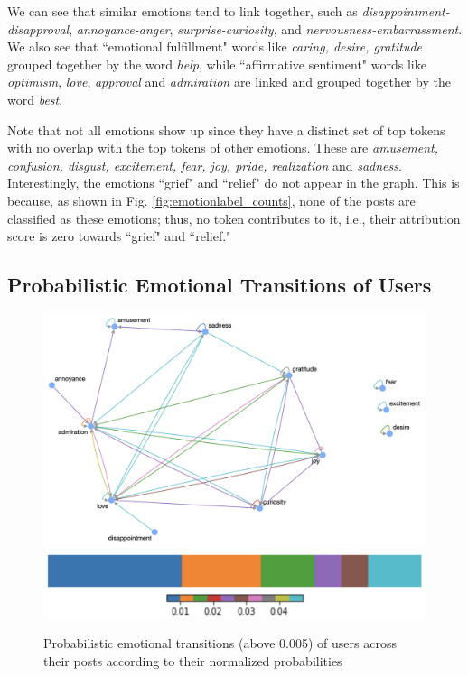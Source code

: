 \documentclass[conference,compsoc]{IEEEtran}
\begin{document}
We can see that similar emotions tend to link together, such as \textit{disappointment-disapproval}, \textit{annoyance-anger}, \textit{surprise-curiosity}, and \textit{nervousness-embarrassment}. We also see that ``emotional fulfillment" words like \textit{caring, desire, gratitude} grouped together by the word \textit{help}, while ``affirmative sentiment" words like \textit{optimism}, \textit{love}, \textit{approval} and \textit{admiration} are linked and grouped together by the word \textit{best}.

Note that not all emotions show up since they have a distinct set of top tokens with no overlap with the top tokens of other emotions. These are \textit{amusement,  confusion, disgust, excitement, fear, joy, pride, realization} and \textit{sadness}. Interestingly, the emotions ``grief" and ``relief" do not appear in the graph. This is because, as shown in Fig. \ref{fig:emotionlabel_counts}, none of the posts are classified as these emotions; thus, no token contributes to it, i.e., their attribution score is zero towards ``grief" and ``relief." 

\subsection{Probabilistic Emotional Transitions of Users}

\begin{figure}[h!]
{\includegraphics[width=\linewidth]{figs/lifecycle.png}}
\centering
{\includegraphics[width=0.6\linewidth]{figs/color_ref_lifecycle.png}}
\caption{Probabilistic emotional transitions (above 0.005) of users across their posts according to their normalized probabilities}
\label{fig:lifecycle}
\end{figure}
\end{document}
